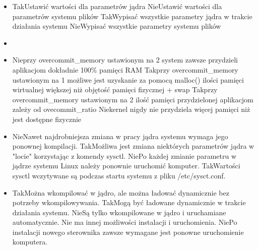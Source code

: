 \begin{itemize}
	\item {}
	{Tak}{Ustawić wartości dla parametrów jądra}
	{Nie}{Ustawić wartości dla parametrów systemu plików}
	{Tak}{Wypisać wszystkie parametry jądra w trakcie działania systemu}
	{Nie}{Wypisać wszystkie parametry systemu plików}
	
	\newpage
	
		\item {}
	
	\item {}
	{Nie}{przy overcommit\_memory ustawionym na 2 system zawsze przydzieli aplikacjom dokładnie 100\% pamięci RAM}
	{Tak}{przy overcommit\_memory ustawionym na 1 możliwe jest uzyskanie za pomocą malloc() ilości pamięci wirtualnej większej niż objętość pamięci fizycznej + swap}
	{Tak}{przy overcommit\_memory ustawionym na 2 ilość pamięci przydzielonej aplikacjom zależy od ovecommit\_ratio}
	{Nie}{kernel nigdy nie przydziela więcej pamięci niż jest dostępne fizycznie}
	
	\item {}
	{Nie}{Nawet najdrobniejsza zmiana w pracy jądra systemu wymaga jego ponownej kompilacji.}
	{Tak}{Możliwa jest zmiana niektórych parametrów jądra w "locie" korzystając z komendy sysctl.}
	{Nie}{Po każdej zmianie parametru w jądrze systemu Linux należy ponownie uruchomić komputer.}
	{Tak}{Wartości sysctl wczytywane są podczas startu systemu z pliku /etc/sysct.conf.}
	
	\item {}
	{Tak}{Można wkompilować w jądro, ale można ładować dynamicznie bez potrzeby wkompilowywania.}
	{Tak}{Mogą być ładowane dynamicznie w trakcie działania systemu.}
	{Nie}{Są tylko wkompilowane w jądro i uruchamiane automatycznie. Nie ma innej możliwości instalacji i uruchomienia.}
	{Nie}{Po instalacji nowego sterownika zawsze wymagane jest ponowne uruchomienie komputera.}
	

\end{itemize}
